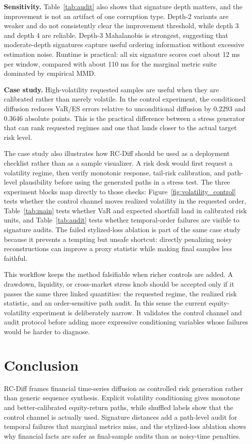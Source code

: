 \documentclass[letterpaper]{article}
\begin{document}
\textbf{Sensitivity.} Table~\ref{tab:audit} also shows that signature depth matters, and the improvement is not an artifact of one corruption type. Depth-2 variants are weaker and do not consistently clear the improvement threshold, while depth 3 and depth 4 are reliable. Depth-3 Mahalanobis is strongest, suggesting that moderate-depth signatures capture useful ordering information without excessive estimation noise. Runtime is practical: all six signature scores cost about 12 ms per window, compared with about 110 ms for the marginal metric suite dominated by empirical MMD.

\textbf{Case study.} High-volatility requested samples are useful when they are calibrated rather than merely volatile. In the control experiment, the conditioned diffusion reduces VaR/ES errors relative to unconditional diffusion by 0.2293 and 0.3646 absolute points. This is the practical difference between a stress generator that can rank requested regimes and one that lands closer to the actual target risk level.

The case study also illustrates how RC-Diff should be used as a deployment checklist rather than as a sample visualizer. A risk desk would first request a volatility regime, then verify monotonic response, tail-risk calibration, and path-level plausibility before using the generated paths in a stress test. The three experiment blocks map directly to those checks: Figure~\ref{fig:volatility_control} tests whether the control channel moves realized volatility in the requested order, Table~\ref{tab:main} tests whether VaR and expected shortfall land in calibrated risk units, and Table~\ref{tab:audit} tests whether temporal-order failures are visible to signature audits. The failed stylized-loss ablation is part of the same case study because it prevents a tempting but unsafe shortcut: directly penalizing noisy reconstructions can improve a proxy statistic while making final samples less faithful.

This workflow keeps the method falsifiable when richer controls are added. A drawdown, liquidity, or cross-market stress knob should be accepted only if it passes the same three linked quantities: the requested regime, the realized risk statistic, and an order-sensitive path audit. In this sense the current equity-volatility experiment is deliberately narrow. It validates the control channel and audit protocol before adding more expressive conditioning variables whose failures would be harder to diagnose.

\section{Conclusion}
RC-Diff frames financial time-series diffusion as controlled risk generation rather than generic sequence synthesis. Explicit volatility conditioning gives monotone and better-calibrated equity-return paths, while shuffled labels show that the control channel is actually used. Signature distances add a path-level audit for temporal failures that marginal metrics miss, and the stylized-loss ablation shows why financial facts are safer as final-sample audits than as noisy-time penalties.
\end{document}
